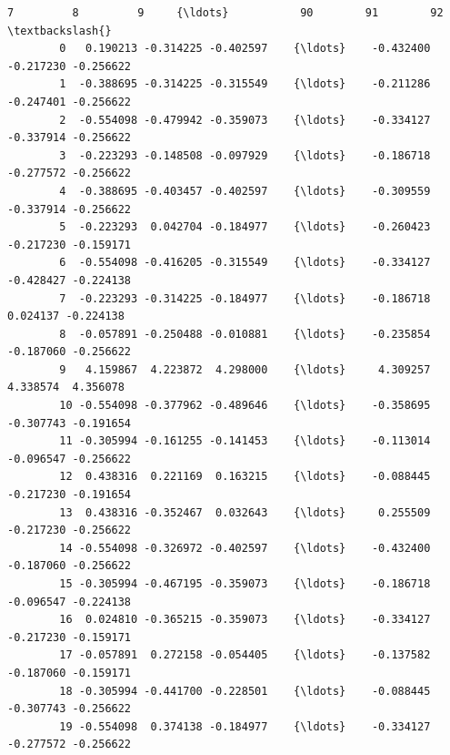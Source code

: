 \documentclass[11pt]{article}
\begin{document}
\begin{Verbatim}[commandchars=\\\{\}]
                  7         8         9     {\ldots}           90        91        92  \textbackslash{}
        0   0.190213 -0.314225 -0.402597    {\ldots}    -0.432400 -0.217230 -0.256622   
        1  -0.388695 -0.314225 -0.315549    {\ldots}    -0.211286 -0.247401 -0.256622   
        2  -0.554098 -0.479942 -0.359073    {\ldots}    -0.334127 -0.337914 -0.256622   
        3  -0.223293 -0.148508 -0.097929    {\ldots}    -0.186718 -0.277572 -0.256622   
        4  -0.388695 -0.403457 -0.402597    {\ldots}    -0.309559 -0.337914 -0.256622   
        5  -0.223293  0.042704 -0.184977    {\ldots}    -0.260423 -0.217230 -0.159171   
        6  -0.554098 -0.416205 -0.315549    {\ldots}    -0.334127 -0.428427 -0.224138   
        7  -0.223293 -0.314225 -0.184977    {\ldots}    -0.186718  0.024137 -0.224138   
        8  -0.057891 -0.250488 -0.010881    {\ldots}    -0.235854 -0.187060 -0.256622   
        9   4.159867  4.223872  4.298000    {\ldots}     4.309257  4.338574  4.356078   
        10 -0.554098 -0.377962 -0.489646    {\ldots}    -0.358695 -0.307743 -0.191654   
        11 -0.305994 -0.161255 -0.141453    {\ldots}    -0.113014 -0.096547 -0.256622   
        12  0.438316  0.221169  0.163215    {\ldots}    -0.088445 -0.217230 -0.191654   
        13  0.438316 -0.352467  0.032643    {\ldots}     0.255509 -0.217230 -0.256622   
        14 -0.554098 -0.326972 -0.402597    {\ldots}    -0.432400 -0.187060 -0.256622   
        15 -0.305994 -0.467195 -0.359073    {\ldots}    -0.186718 -0.096547 -0.224138   
        16  0.024810 -0.365215 -0.359073    {\ldots}    -0.334127 -0.217230 -0.159171   
        17 -0.057891  0.272158 -0.054405    {\ldots}    -0.137582 -0.187060 -0.159171   
        18 -0.305994 -0.441700 -0.228501    {\ldots}    -0.088445 -0.307743 -0.256622   
        19 -0.554098  0.374138 -0.184977    {\ldots}    -0.334127 -0.277572 -0.256622   
        

\end{Verbatim}
\end{document}

